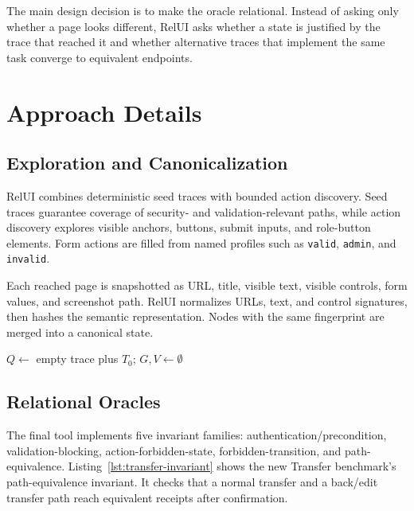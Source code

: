 \documentclass[sigconf,nonacm]{acmart}
\newcommand{\RelUI}{RelUI\xspace}
\begin{document}
The main design decision is to make the oracle relational. Instead of asking only whether a page looks different, \RelUI asks whether a state is justified by the trace that reached it and whether alternative traces that implement the same task converge to equivalent endpoints.

\section{Approach Details}\label{sec:approach-details}
\subsection{Exploration and Canonicalization}
\RelUI combines deterministic seed traces with bounded action discovery. Seed traces guarantee coverage of security- and validation-relevant paths, while action discovery explores visible anchors, buttons, submit inputs, and role-button elements. Form actions are filled from named profiles such as \texttt{valid}, \texttt{admin}, and \texttt{invalid}.

Each reached page is snapshotted as URL, title, visible text, visible controls, form values, and screenshot path. \RelUI normalizes URLs, text, and control signatures, then hashes the semantic representation. Nodes with the same fingerprint are merged into a canonical state.

\begin{algorithm}[t]
\caption{\RelUI exploration and checking}
\label{alg:relui}
$Q \leftarrow$ empty trace plus $T_0$; $G,V \leftarrow \emptyset$\;
\;
\end{algorithm}

\subsection{Relational Oracles}
The final tool implements five invariant families: authentication/precondition, validation-blocking, action-forbidden-state, forbidden-transition, and path-equivalence. Listing~\ref{lst:transfer-invariant} shows the new Transfer benchmark's path-equivalence invariant. It checks that a normal transfer and a back/edit transfer path reach equivalent receipts after confirmation.
\end{document}
